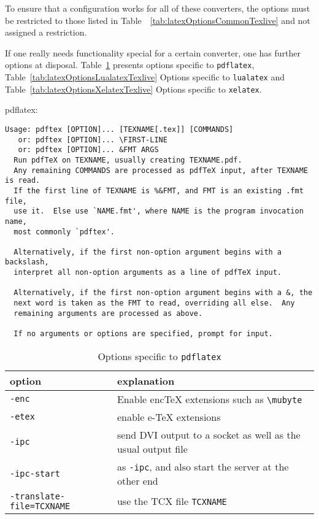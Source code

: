 \documentclass{article}
\newcommand{\pdflatex}{\texttt{pdflatex}}
\newcommand{\lualatex}{\texttt{lualatex}}
\newcommand{\xelatex}{\texttt{xelatex}}
\begin{document}
To ensure that a configuration works for all of these converters, 
the options must be restricted to those listed in Table~~\ref{tab:latexOptionsCommonTexlive} 
and not assigned a restriction. 

If one really needs functionality special for a certain converter, 
one has further options at disposal. 
Table~\ref{tab:latexOptionsPdflatexTexlive} presents options specific to \pdflatex{}, 
Table~\ref{tab:latexOptionsLualatexTexlive} Options specific to \lualatex{} and 
Table~\ref{tab:latexOptionsXelatexTexlive} Options specific to \xelatex. 





pdflatex: 

\begin{verbatim}
Usage: pdftex [OPTION]... [TEXNAME[.tex]] [COMMANDS]
   or: pdftex [OPTION]... \FIRST-LINE
   or: pdftex [OPTION]... &FMT ARGS
  Run pdfTeX on TEXNAME, usually creating TEXNAME.pdf.
  Any remaining COMMANDS are processed as pdfTeX input, after TEXNAME is read.
  If the first line of TEXNAME is %&FMT, and FMT is an existing .fmt file,
  use it.  Else use `NAME.fmt', where NAME is the program invocation name,
  most commonly `pdftex'.

  Alternatively, if the first non-option argument begins with a backslash,
  interpret all non-option arguments as a line of pdfTeX input.

  Alternatively, if the first non-option argument begins with a &, the
  next word is taken as the FMT to read, overriding all else.  Any
  remaining arguments are processed as above.

  If no arguments or options are specified, prompt for input.
\end{verbatim}

  {\small
  \begin{longtable}{|ll|}
  \toprule
  option & explanation \\
  \midrule
  \midrule
  \endfirsthead%
  \bottomrule
  \caption{\label{tab:latexOptionsPdflatexTexlive} Options specific to \pdflatex{} }
  \endlastfoot%
  \texttt{-enc}                    & Enable encTeX extensions such as \texttt{\textbackslash{}mubyte} \\
  \texttt{-etex}                   & enable e-TeX extensions \\
  \texttt{-ipc}                    & send DVI output to a socket as well as the usual output file \\
  \texttt{-ipc-start}              & as \texttt{-ipc}, and also start the server at the other end \\
  \texttt{-translate-file=TCXNAME} & use the TCX file \texttt{TCXNAME} \\
  \end{longtable}
  }
\end{document}
